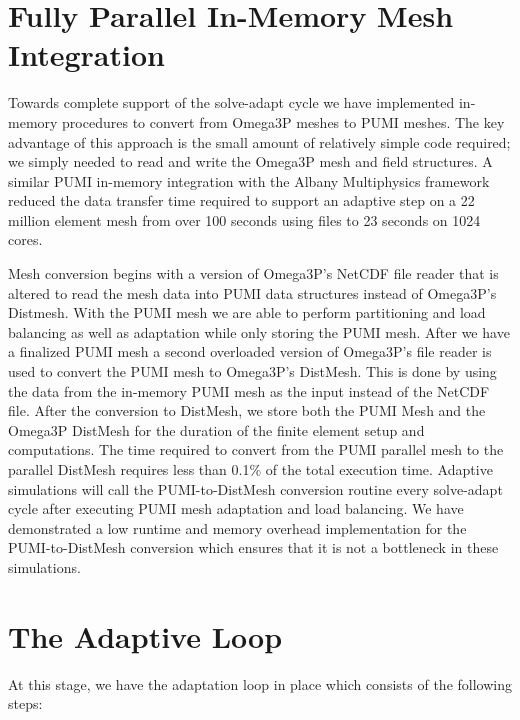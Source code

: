 \documentclass[review,12pt]{elsarticle_summary_report}
\begin{document}

\section{\label{in_memory}Fully Parallel In-Memory Mesh Integration}
Towards complete support of the solve-adapt cycle we have implemented in-memory
procedures to convert from Omega3P meshes to PUMI meshes.
The key advantage of this approach is the small amount of relatively simple code
required; we simply needed to read and write the Omega3P mesh and field
structures.
A similar PUMI in-memory integration with the Albany Multiphysics
framework~\cite{salinger2013albany,Albany2015} reduced the data transfer time
required to support an adaptive step on a 22 million element mesh from over 100
seconds using files to 23 seconds on 1024 cores.

Mesh conversion begins with a version of Omega3P's NetCDF file reader that is altered
to read the mesh data into PUMI data structures instead of Omega3P's Distmesh. With 
the PUMI mesh we are able to perform partitioning and load balancing as well as adaptation 
while only storing the PUMI mesh. After we have a finalized PUMI mesh a second 
overloaded version of Omega3P's file reader is used to convert the PUMI mesh to 
Omega3P's DistMesh. This is done by using the data from the in-memory PUMI mesh as the 
input instead of the NetCDF file. After the conversion to DistMesh, we store both the
PUMI Mesh and the Omega3P DistMesh for the duration of the finite element setup and 
computations. The time required to convert from the PUMI parallel mesh to the
parallel DistMesh requires less than 0.1\% of the total execution time.
Adaptive simulations will call the PUMI-to-DistMesh conversion routine every
solve-adapt cycle after executing PUMI mesh adaptation and load balancing.
We have demonstrated a low runtime and memory overhead implementation for the
PUMI-to-DistMesh conversion which ensures that it is not a bottleneck
in these simulations.


\clearpage
\newpage

\section{\label{adaptive_loop}The Adaptive Loop}
At this stage, we have the adaptation loop in place which consists of the following steps:
\end{document}
